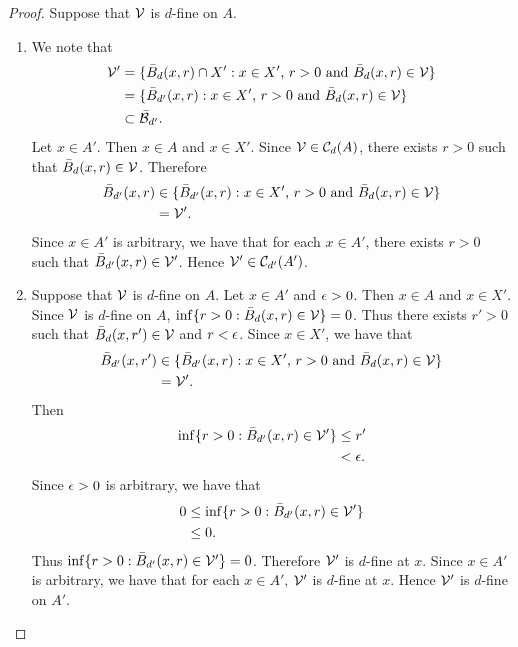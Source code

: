 \documentclass{book}
\begin{document}
	\begin{proof}
		Suppose that $\mathcal{V}$ is $d$-fine on $A$.
		\begin{enumerate}
			\item We note that 
			\begin{align*}
				\mathcal{V}' 
				& = \{\bar{B}_d(x,r) \cap X': \text{$x \in X'$, $r > 0$ and $\bar{B}_d(x,r) \in \mathcal{V}$}\} \\
				& = \{ \bar{B}_{d'}(x,r): \text{$x \in X'$, $r > 0$ and $\bar{B}_d(x,r) \in \mathcal{V}$}\} \\
				& \subset \bar{\mathcal{B}}_{d'}.
			\end{align*}  
			Let $x \in A'$. Then $x \in A$ and $x \in X'$. Since $\mathcal{V} \in \mathcal{C}_d(A)$, there exists $r>0$ such that $\bar{B}_d(x, r) \in \mathcal{V}$. Therefore 
			\begin{align*}
				\bar{B}_{d'}(x,r)
				& \in \{ \bar{B}_{d'}(x,r): \text{$x \in X'$, $r > 0$ and $\bar{B}_d(x,r) \in \mathcal{V}$} \} \\
				& = \mathcal{V}'.
			\end{align*}
			Since $x \in A'$ is arbitrary, we have that for each $x \in A'$, there exists $r>0$ such that $\bar{B}_{d'}(x, r) \in \mathcal{V}'$. Hence $\mathcal{V}' \in \mathcal{C}_{d'}(A')$. 
			\item Suppose that $\mathcal{V}$ is $d$-fine on $A$. Let $x \in A'$ and $\epsilon >0$. Then $x \in A$ and $x \in X'$. Since $\mathcal{V}$ is $d$-fine on $A$, $\inf \{r > 0: \bar{B}_d(x, r) \in \mathcal{V}\} = 0$. Thus there exists $r' > 0$ such that $\bar{B}_d(x, r') \in \mathcal{V}$ and $r < \epsilon$. Since $x \in X'$, we have that 
			\begin{align*}
				\bar{B}_{d'}(x,r')
				& \in \{ \bar{B}_{d'}(x,r): \text{$x \in X'$, $r > 0$ and $\bar{B}_d(x,r) \in \mathcal{V}$} \} \\
				& = \mathcal{V}'.
			\end{align*}
			Then
			\begin{align*}
				\inf \{r > 0: \bar{B}_{d'}(x, r) \in \mathcal{V}'\} 
				& \leq r' \\
				& < \epsilon. 
			\end{align*}
			Since $\epsilon > 0$ is arbitrary, we have that 
			\begin{align*}
				0
				& \leq \inf \{r > 0: \bar{B}_{d'}(x, r) \in \mathcal{V}'\} \\ 
				& \leq 0.
			\end{align*}
			Thus $\inf \{r > 0: \bar{B}_{d'}(x, r) \in \mathcal{V}'\} = 0$. Therefore $\mathcal{V}'$ is $d$-fine at $x$. Since $x \in A'$ is arbitrary, we have that for each $x \in A'$, $\mathcal{V}'$ is $d$-fine at $x$. Hence $\mathcal{V}'$ is $d$-fine on $A'$.		
		\end{enumerate}
	\end{proof}
	
\end{document}
